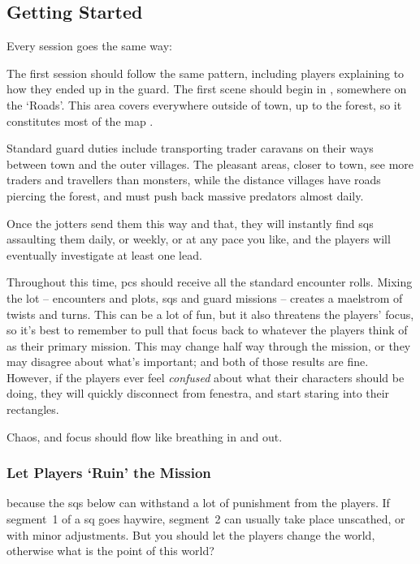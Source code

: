 \label{sqList}

\needspace{12em}
\begin{multicols}{2}

\subsection{Getting Started}

Every session goes the same way:



The first session should follow the same pattern, including players explaining to  how they ended up in the \gls{guard}.
The first scene should begin in , somewhere on the `Roads'.
This area covers everywhere outside of \gls{town}, up to the forest, so it constitutes most of the map .

Standard \gls{guard} duties%
include transporting trader caravans on their ways between \gls{town} and the outer \glspl{village}.
The pleasant areas, closer to \gls{town}, see more traders and travellers than monsters, while the distance \glspl{village} have roads piercing the forest, and must push back massive predators almost daily.

Once the \glspl{jotter} send them this way and that, they will instantly find \glspl{sq} assaulting them daily, or weekly, or at any pace you like, and the players will eventually investigate at least one lead.

Throughout this time, \glspl{pc} should receive all the standard encounter rolls.
Mixing the lot -- encounters and plots, \glspl{sq} and \gls{guard} missions -- creates a maelstrom of twists and turns.
This can be a lot of fun, but it also threatens the players' focus, so it's best to remember to pull that focus back to whatever the players think of as their primary mission.
This may change half way through the mission, or they may disagree about what's important; and both of those results are fine.
However, if the players ever feel \emph{confused} about what their characters should be doing, they will quickly disconnect from \gls{fenestra}, and start staring into their rectangles.

Chaos, and focus should flow like breathing in and out.

\subsubsection{Let Players `Ruin' the Mission}
because the \glspl{sq} below can withstand a lot of punishment from the players.
If \gls{segment}~1 of a \gls{sq} goes haywire, \gls{segment}~2 can usually take place unscathed, or with minor adjustments.
But you should let the players change the world, otherwise what is the point of this world?


\end{multicols}
